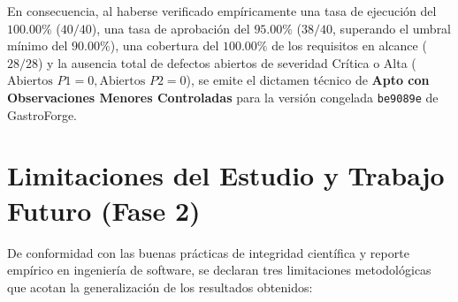 \documentclass[stu,12pt,a4paper]{apa7}
\begin{document}
En consecuencia, al haberse verificado empíricamente una tasa de ejecución del \(100.00\%\) (\(40/40\)), una tasa de aprobación del \(95.00\%\) (\(38/40\), superando el umbral mínimo del \(90.00\%\)), una cobertura del \(100.00\%\) de los requisitos en alcance (\(28/28\)) y la ausencia total de defectos abiertos de severidad Crítica o Alta (\(\text{Abiertos } P1 = 0, \text{Abiertos } P2 = 0\)), se emite el dictamen técnico de \textbf{Apto con Observaciones Menores Controladas} para la versión congelada \texttt{be9089e} de GastroForge.

\section{Limitaciones del Estudio y Trabajo Futuro (Fase 2)}\label{limitaciones-del-estudio-y-trabajo-futuro-fase-2}

De conformidad con las buenas prácticas de integridad científica y reporte empírico en ingeniería de software, se declaran tres limitaciones metodológicas que acotan la generalización de los resultados obtenidos:
\end{document}
